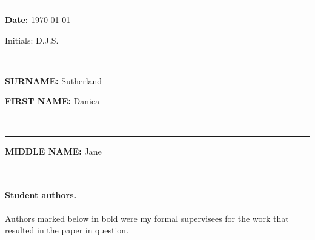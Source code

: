 \documentclass[10pt]{article}
\begin{document}
%



\newpage
{}\bigskip\rule{3.5in}{0mm}
\parbox[t]{2in}{{\bf Date:} \today}\parbox[t]{1in}{Initials: D.J.S.} \\
\noindent\parbox[t]{.5in}{\mbox{}}\parbox[t]{3.04in}{{\bf SURNAME:}
  Sutherland}\parbox[t]{3.2in}{{\bf FIRST NAME:} Danica}
\\\rule{3.54in}{0mm}\parbox[t]{3.2in}{{\bf MIDDLE NAME:} Jane}
\\[5mm]
\setcounter{section}{0}
\vspace{12pt}

%

\paragraph{Student authors.} Authors marked below in bold were my formal supervisees for the work that resulted in the paper in question.
\end{document}
